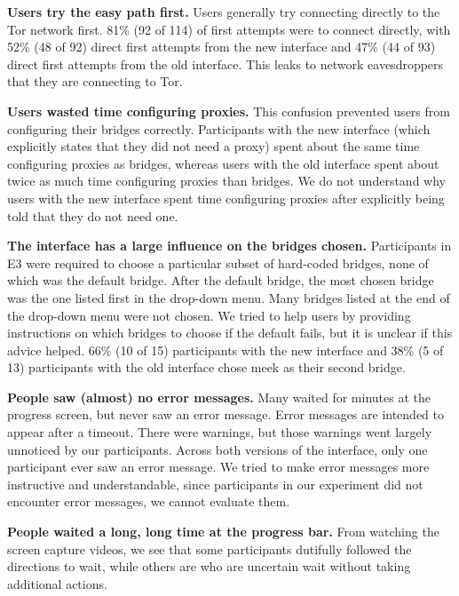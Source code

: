 \documentclass[USenglish,oneside,twocolumn]{article}
\begin{document}
\begin{description}
\item {\bfseries Users try the easy path first.} Users generally try connecting directly to the Tor network first. 81\% (92 of 114) of first attempts were to connect directly, with 52\% (48 of 92) direct first attempts from the new interface and 47\% (44 of 93) direct first attempts from the old interface. This leaks to network eavesdroppers that they are connecting to Tor.

\item {\bfseries Users wasted time configuring proxies.} This confusion prevented users from configuring their bridges correctly. Participants with the new interface (which explicitly states that they did not need a proxy) spent about the same time configuring proxies as bridges, whereas users with the old interface spent about twice as much time configuring proxies than bridges. We do not understand why users with the new interface spent time configuring proxies after explicitly being told that they do not need one.

\item {\bfseries The interface has a large influence on the bridges chosen.}
Participants in E3 were required to choose a particular subset of hard-coded bridges, none of which was the default bridge. After the default bridge, the most chosen bridge was the one listed first in the drop-down menu. Many bridges listed at the end of the drop-down menu were not chosen. We tried to help users by providing instructions on which bridges to choose if the default fails, but it is unclear if this advice helped. 66\% (10 of 15) participants with the new interface and 38\% (5 of 13) participants with the old interface chose meek as their second bridge.

\item {\bfseries People saw (almost) no error messages.} Many waited for minutes at the progress screen, but never saw an error message. Error messages are intended to appear after a timeout. There were warnings, but those warnings went largely unnoticed by our participants. Across both versions of the interface, only one participant ever saw an error message. We tried to make error messages more instructive and understandable, since participants in our experiment did not encounter error messages, we cannot evaluate them. 

\item {\bfseries People waited a long, long time at the progress bar.}
From watching the screen capture videos, we see that some participants dutifully followed the directions to wait, while others are who are uncertain wait without taking additional actions.
\end{description}
\end{document}
